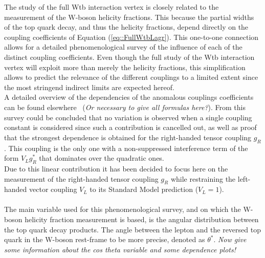 The study of the full Wtb interaction vertex is closely related to the measurement of the W-boson helicity fractions. This because the partial widths of the top quark decay, and thus the helicity fractions, depend directly on the coupling coefficients of Equation (\ref{eq::FullWtbLagr}).
This one-to-one connection allows for a detailed phenomenological survey of the influence of each of the distinct coupling coefficients. Even though the full study of the Wtb interaction vertex will exploit more than merely the helicity fractions, this simplification allows to predict the relevance of the different couplings to a limited extent since the most stringend indirect limits are expected hereof.
\\
A detailed overview of the dependencies of the anomalous couplings coefficients can be found elsewhere~\cite{WidthLinkWtb} (\textit{Or necessary to give all formulas here?}). %
From this survey could be concluded that no variation is observed when a single coupling constant is considered since such a contribution is cancelled out, as well as proof that the strongest dependence is obtained for the right-handed tensor coupling $g_R$.
This coupling is the only one with a non-suppressed interference term of the form $V_L g_R^{*}$ that dominates over the quadratic ones.
\\
Due to this linear contribution it has been decided to focus here on the measurement of the right-handed tensor coupling $g_R$ while restraining the left-handed vector coupling $V_L$ to its Standard Model prediction ($V_L = 1$).
\\
\\
The main variable used for this phenomenological survey, and on which the W-boson helicity fraction measurement is based, is the angular distribution between the top quark decay products. The angle between the lepton and the reversed top quark in the W-boson rest-frame to be more precise, denoted as $\theta^{*}$. 
\textit{Now give some information about the cos theta variable and some dependence plots!}

